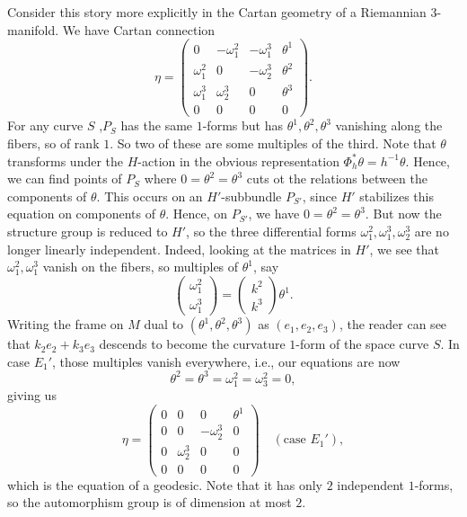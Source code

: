 Consider this story more explicitly in the Cartan geometry of a Riemannian $3$-manifold. We have Cartan connection 
\[\eta=\begin{pmatrix}
    0 & -\omega^2_1 & -\omega^3_1 & \theta^1\\
    \omega^2_1 & 0 & -\omega^3_2 & \theta^2\\
    \omega^3_1 & \omega^3_2 & 0 & \theta^3\\
    0 & 0 & 0 & 0
\end{pmatrix}.\]
For any curve $S$ ,$P_S$ has the same $1$-forms but has $\theta^1,\theta^2,\theta^3$ vanishing along the fibers, so of rank $1$. So two of these are some multiples of the third. Note that $\theta$ transforms under the $H$-action in the obvious representation $\Phi_h^\ast\theta=h^{-1}\theta$.
Hence, we can find points of $P_S$ where $0=\theta^2=\theta^3$ cuts ot the relations between the components of $\theta$. This occurs on an $H'$-subbundle $P_{S'}$, since $H'$ stabilizes this equation on components of $\theta$. Hence, on $P_{S'}$, we have $0=\theta^2=\theta^3$. But now the structure group is reduced to $H'$, so the three differential forms $\omega^2_1,\omega^3_1,\omega^3_2$ are no longer linearly independent. Indeed, looking at the matrices in $H'$, we see that $\omega^2_1,\omega^3_1$ vanish on the fibers, so multiples of $\theta^1$, say 
\[\begin{pmatrix}
    \omega^2_1\\ \omega^3_1
\end{pmatrix}=\begin{pmatrix}
    k^2 \\ k^3
\end{pmatrix}\theta^1.\]
Writing the frame on $M$ dual to $(\theta^1,\theta^2,\theta^3)$ as $(e_1,e_2,e_3)$, the reader can see that $k_2e_2+k_3e_3$ descends to become the curvature $1$-form of the space curve $S$. In case $E_1'$, those multiples vanish everywhere, i.e., our equations are now 
\[\theta^2=\theta^3=\omega^2_1=\omega^2_3=0,\]
giving us 
\[\eta=\begin{pmatrix}
    0 & 0 & 0 & \theta^1 \\
    0 & 0 & -\omega^3_2 & 0\\
    0 & \omega^3_2 & 0 & 0\\
    0 & 0 & 0 & 0
\end{pmatrix}\quad (\text{case }E_1'),\]
which is the equation of a geodesic. Note that it has only $2$ independent $1$-forms, so the automorphism group is of dimension at most $2$.

